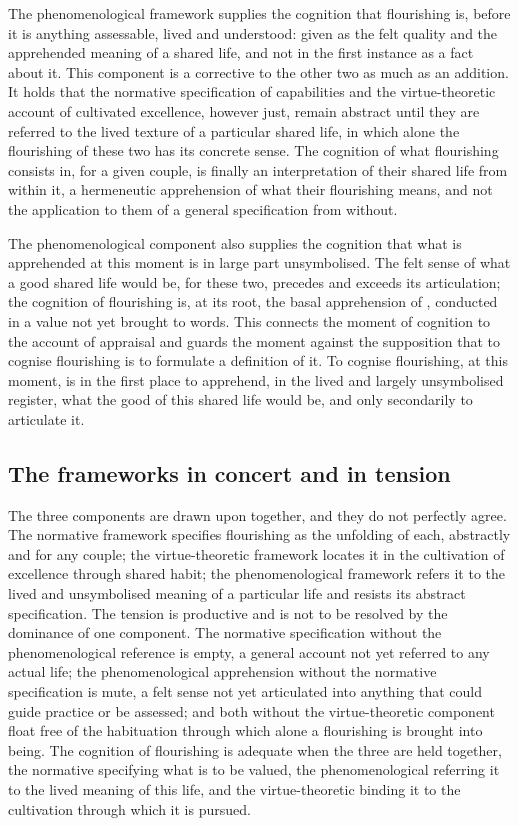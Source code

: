 The phenomenological framework supplies the cognition that flourishing is, before it is anything assessable, lived and understood: given as the felt quality and the apprehended meaning of a shared life, and not in the first instance as a fact about it. This component is a corrective to the other two as much as an addition. It holds that the normative specification of capabilities and the virtue-theoretic account of cultivated excellence, however just, remain abstract until they are referred to the lived texture of a particular shared life, in which alone the flourishing of these two has its concrete sense. The cognition of what flourishing consists in, for a given couple, is finally an interpretation of their shared life from within it, a hermeneutic apprehension of what their flourishing means, and not the application to them of a general specification from without.

The phenomenological component also supplies the cognition that what is apprehended at this moment is in large part unsymbolised. The felt sense of what a good shared life would be, for these two, precedes and exceeds its articulation; the cognition of flourishing is, at its root, the basal apprehension of , conducted in a value not yet brought to words. This connects the moment of cognition to the account of appraisal and guards the moment against the supposition that to cognise flourishing is to formulate a definition of it. To cognise flourishing, at this moment, is in the first place to apprehend, in the lived and largely unsymbolised register, what the good of this shared life would be, and only secondarily to articulate it.

\subsection{The frameworks in concert and in tension}
\label{p11:sec:cog-concert}

The three components are drawn upon together, and they do not perfectly agree. The normative framework specifies flourishing as the unfolding of each, abstractly and for any couple; the virtue-theoretic framework locates it in the cultivation of excellence through shared habit; the phenomenological framework refers it to the lived and unsymbolised meaning of a particular life and resists its abstract specification. The tension is productive and is not to be resolved by the dominance of one component. The normative specification without the phenomenological reference is empty, a general account not yet referred to any actual life; the phenomenological apprehension without the normative specification is mute, a felt sense not yet articulated into anything that could guide practice or be assessed; and both without the virtue-theoretic component float free of the habituation through which alone a flourishing is brought into being. The cognition of flourishing is adequate when the three are held together, the normative specifying what is to be valued, the phenomenological referring it to the lived meaning of this life, and the virtue-theoretic binding it to the cultivation through which it is pursued.

